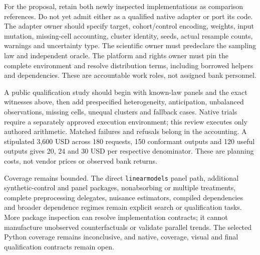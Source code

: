 For the proposal, retain both newly inspected implementations as comparison
references. Do not yet admit either as a qualified native adapter or port its
code. The adapter owner should specify target, cohort/control encoding,
weights, input mutation, missing-cell accounting, cluster identity, seeds,
actual resample counts, warnings and uncertainty type. The scientific owner
must predeclare the sampling law and independent oracle. The platform and
rights owner must pin the complete environment and resolve distribution
terms, including borrowed helpers and dependencies. These are accountable
work roles, not assigned bank personnel.
\citep{exec24_panelpy_contract,exec24_panelpy_differences,exec24_panelpy_csdid}

A public qualification study should begin with known-law panels and the
exact witnesses above, then add prespecified heterogeneity, anticipation,
unbalanced observations, missing cells, unequal clusters and fallback cases.
Native trials require a separately approved execution environment; this
review executes only authored arithmetic. Matched failures and refusals
belong in the accounting. A stipulated 3,600 USD across 180 requests,
150 conformant outputs and 120 useful outputs gives 20, 24 and 30 USD
per respective denominator. These are planning costs, not vendor prices
or observed bank returns.
\citep{exec24_panelpy_contract}

Coverage remains bounded. The direct \texttt{linearmodels} panel path,
additional synthetic-control and panel packages, nonabsorbing or multiple
treatments, complete preprocessing delegates, nuisance estimators, compiled
dependencies and broader dependence regimes remain explicit search or
qualification tasks. More package inspection can resolve implementation
contracts; it cannot manufacture unobserved counterfactuals or validate
parallel trends. The selected Python coverage remains inconclusive, and
native, coverage, visual and final qualification contracts remain open.
\citep{exec24_panelpy_contract}
